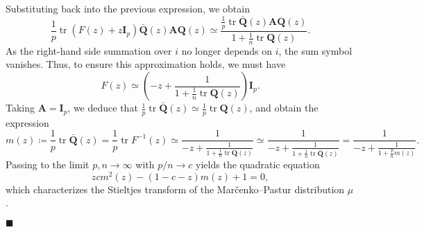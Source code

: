 \documentclass[12pt]{article}
\DeclareMathOperator{\tr}{tr}
\begin{document}
Substituting back into the previous expression, we obtain
$$
\frac{1}{p} \tr (F(z) + z \mathbf{I}_p) \bar{\mathbf{Q}}(z) \mathbf{A} \mathbf{Q}(z) 
\simeq \frac{\frac{1}{p} \tr \bar{\mathbf{Q}}(z) \mathbf{A} \mathbf{Q}(z)}{1 + \frac{1}{n} \tr \mathbf{Q}(z)}.
$$
As the right-hand side summation over $i$ no longer depends on $i$, the sum symbol vanishes. Thus, to ensure this approximation holds, we must have
$$
F(z) \simeq \left( -z + \frac{1}{1 + \frac{1}{n} \tr \mathbf{Q}(z)} \right) \mathbf{I}_p.
$$
Taking $\mathbf{A} = \mathbf{I}_p$, we deduce that $\frac{1}{p} \tr \bar{\mathbf{Q}}(z) \simeq \frac{1}{p} \tr \mathbf{Q}(z)$, and obtain the expression
\begin{equation*}
m(z) \coloneqq \frac{1}{p} \tr \bar{\mathbf{Q}}(z)
= \frac{1}{p} \tr F^{-1}(z)
\simeq \frac{1}{-z + \frac{1}{1 + \frac{1}{n} \tr \mathbf{Q}(z)}} \simeq \frac{1}{-z + \frac{1}{1 + \frac{1}{n} \tr \bar{\mathbf{Q}}(z)}}
= \frac{1}{-z + \frac{1}{1 + \frac{p}{n} m(z)}}.
\end{equation*}
Passing to the limit $p, n \to \infty$ with $p/n \to c$ yields the quadratic equation
$$
z c m^2(z) - (1 - c - z) m(z) + 1 = 0,
$$
which characterizes the Stieltjes transform of the Mar\v{c}enko--Pastur distribution $\mu$. 
\begin{flushright}
$\blacksquare$
\end{flushright}
\end{document}

